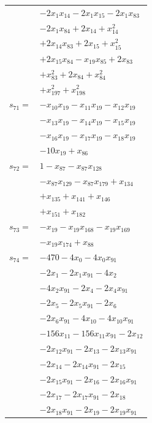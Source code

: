 \begin{longtable}{@{}r@{\;}l@{}}
 & \(\displaystyle -2x_{1}x_{14} -2x_{1}x_{15} -2x_{1}x_{83}\) \\
 & \(\displaystyle -2x_{1}x_{84} +2x_{14} +x_{14}^{2}\) \\
 & \(\displaystyle +2x_{14}x_{83} +2x_{15} +x_{15}^{2}\) \\
 & \(\displaystyle +2x_{15}x_{84} -x_{19}x_{85} +2x_{83}\) \\
 & \(\displaystyle +x_{83}^{2} +2x_{84} +x_{84}^{2}\) \\
 & \(\displaystyle +x_{197}^{2} +x_{198}^{2}\) \\[3pt]
\(s_{71}=\) & \(\displaystyle -x_{10}x_{19} -x_{11}x_{19} -x_{12}x_{19}\) \\
 & \(\displaystyle -x_{13}x_{19} -x_{14}x_{19} -x_{15}x_{19}\) \\
 & \(\displaystyle -x_{16}x_{19} -x_{17}x_{19} -x_{18}x_{19}\) \\
 & \(\displaystyle -10x_{19} +x_{86}\) \\[3pt]
\(s_{72}=\) & \(\displaystyle 1 -x_{87} -x_{87}x_{128}\) \\
 & \(\displaystyle -x_{87}x_{129} -x_{87}x_{179} +x_{134}\) \\
 & \(\displaystyle +x_{135} +x_{141} +x_{146}\) \\
 & \(\displaystyle +x_{151} +x_{182}\) \\[3pt]
\(s_{73}=\) & \(\displaystyle -x_{19} -x_{19}x_{168} -x_{19}x_{169}\) \\
 & \(\displaystyle -x_{19}x_{174} +x_{88}\) \\[3pt]
\(s_{74}=\) & \(\displaystyle -470 -4x_{0} -4x_{0}x_{91}\) \\
 & \(\displaystyle -2x_{1} -2x_{1}x_{91} -4x_{2}\) \\
 & \(\displaystyle -4x_{2}x_{91} -2x_{4} -2x_{4}x_{91}\) \\
 & \(\displaystyle -2x_{5} -2x_{5}x_{91} -2x_{6}\) \\
 & \(\displaystyle -2x_{6}x_{91} -4x_{10} -4x_{10}x_{91}\) \\
 & \(\displaystyle -156x_{11} -156x_{11}x_{91} -2x_{12}\) \\
 & \(\displaystyle -2x_{12}x_{91} -2x_{13} -2x_{13}x_{91}\) \\
 & \(\displaystyle -2x_{14} -2x_{14}x_{91} -2x_{15}\) \\
 & \(\displaystyle -2x_{15}x_{91} -2x_{16} -2x_{16}x_{91}\) \\
 & \(\displaystyle -2x_{17} -2x_{17}x_{91} -2x_{18}\) \\
 & \(\displaystyle -2x_{18}x_{91} -2x_{19} -2x_{19}x_{91}\) \\

\end{longtable}
